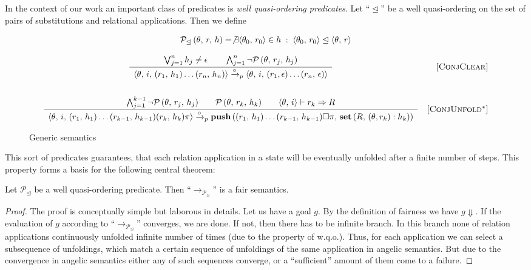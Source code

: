 In the context of our work an important class of predicates is \emph{well quasi-ordering predicates}. Let ``$\trianglelefteq$'' be a well quasi-ordering on the set of
pairs of substitutions and relational applications. Then we define

\[
\mathcal{P}_\trianglelefteq\,(\theta,\,r,\,h) = \not\exists\langle \theta_0,\,r_0 \rangle\in h\;:\; \langle \theta_0,\,r_0 \rangle\trianglelefteq \langle \theta,\,r \rangle
\]

\begin{figure*}[t]
\[\begin{array}{cr}
      \dfrac
      {
      \bigvee_{j=1}^n h_j \not= \epsilon \qquad
      \bigwedge_{j=1}^n \neg\mathcal{P}\,(\theta,\,r_j,\,h_j)
      }
      {\begin{array}{l}
      \langle \theta,\, i,\, (r_1,\,h_1) \ldots (r_n,\,h_n) \rangle \xrightarrow{\circ}_p \langle \theta,\, i,\, (r_1,\epsilon) \ldots (r_n,\, \epsilon) \rangle
      \end{array}}
      &  \mbox{[\textsc{ConjClear}]} \\[10mm]
      \dfrac
      {
       \bigwedge_{j=1}^{k-1} \neg\mathcal{P}\,(\theta,\, r_j,\, h_j) \qquad
       \mathcal{P}\,(\theta,\, r_k,\, h_k) \qquad
       \langle \theta,\, i \rangle \vdash r_k \Rightarrow R 
      }
      {
        \begin{array}{l}
          \langle \theta,\, i,\, (r_1,\,h_1) \ldots (r_{k-1},\,h_{k-1}) (r_k,\, h_k) \pi \rangle \xrightarrow{\circ}_p \mbox{\bf push}\,((r_1,\,h_1) \ldots (r_{k-1},\,h_{k-1})\Box \pi,\, \mbox{\bf set}\,(R, \, (\theta, r_k) : h_k))
         \end{array}
        }
&     \mbox{[\textsc{ConjUnfold$^*$}]} 
\end{array}\]
\caption{Generic semantics}
\label{fair:pred-fair-semantics}
\end{figure*}

This sort of predicates guarantees, that each relation application in a state will be eventually unfolded after a finite number of steps. This property
forms a basis for the following central theorem:

\begin{theorem}
  \label{thm:main}
  Let $\mathcal{P}_\trianglelefteq$ be a well quasi-ordering predicate. Then ``$\rightarrow_{\mathcal{P}_\trianglelefteq}$'' is a fair semantics.
\end{theorem}
\begin{proof}
  The proof is conceptually simple but laborous in details. Let us have a goal $g$. By the definition of fairness we have $g\Downarrow$. If
  the evaluation of $g$ according to ``$\rightarrow_{\mathcal{P}_\trianglelefteq}$'' converges, we are done. If not, then there has to be infinite
  branch. In this branch none of relation applications continuously unfolded infinite number of times (due to the property of w.q.o.). Thus, for each
  application we can select a subsequence of unfoldings, which match a certain sequence of unfoldings of the same application in angelic semantics. But
  due to the convergence in angelic semantics either any of such sequences converge, or a ``sufficient'' amount of them come to a failure.
\end{proof}

